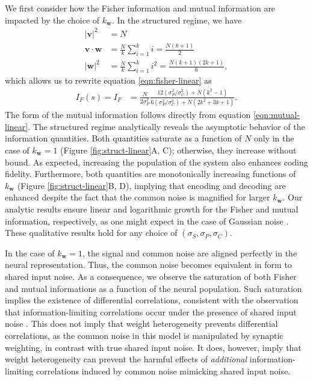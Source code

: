 \documentclass[11pt]{article}
\begin{document}
We first consider how the Fisher information and mutual information are impacted by the choice of $k_{\mathbf{w}}$. In the structured regime, we have 
\begin{align}
	|\mathbf{v}|^2 &= N \\
	\mathbf{v}\cdot\mathbf{w} &= \frac{N}{k} \sum_{i=1}^k i = \frac{N(k+1)}{2} \\
	|\mathbf{w}|^2 &= \frac{N}{k}\sum_{i=1}^k i^2 = \frac{N(k+1)(2k+1)}{6},
\end{align}
which allows us to rewrite equation \ref{eqn:fisher-linear} as
\begin{align}
	I_F(s) = I_F &= \frac{N}{2\sigma_P^2} \frac{12 (\sigma_P^2/\sigma_C^2) + N  (k^2-1)}{6(\sigma_P^2/\sigma_C^2)+ N(2k^2+3k+1)}.
\end{align}
The form of the mutual information follows directly from equation \ref{eqn:mutual-linear}. The structured regime analytically reveals the asymptotic behavior of the information quantities. Both quantities saturate as a function of $N$  only in the case of $k_{\mathbf{w}}=1$ (Figure \ref{fig:struct-linear}A, C); otherwise, they increase without bound. As expected, increasing the population of the system also enhances coding fidelity. Furthermore, both quantities are monotonically increasing functions of $k_{\mathbf{w}}$ (Figure \ref{fig:struct-linear}B, D), implying that encoding and decoding are enhanced despite the fact that the common noise is magnified for larger $k_{\mathbf{w}}$. Our analytic results ensure linear and logarithmic growth for the Fisher and mutual information, respectively, as one might expect in the case of Gaussian noise \cite{Brunel1998}. These qualitative results hold for any choice of $(\sigma_S, \sigma_P, \sigma_C)$.

In the case of $k_{\mathbf{w}}=1$, the signal and common noise are aligned perfectly in the neural representation. Thus, the common noise becomes equivalent in form to shared input noise. As a consequence, we observe the saturation of both Fisher and mutual informations as a function of the neural population. Such saturation implies the existence of differential correlations, consistent with the observation that information-limiting correlations occur under the presence of shared input noise \cite{Moreno-Bote2014}. This does not imply that weight heterogeneity prevents differential correlations, as the common noise in this model is manipulated by synaptic weighting, in contrast with true shared input noise. It does, however, imply that weight heterogeneity can prevent the harmful effects of \textit{additional} information-limiting correlations induced by common noise mimicking shared input noise.
\end{document}

